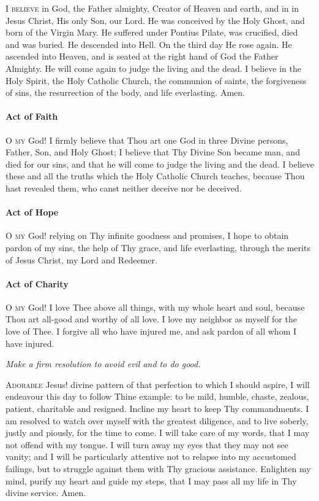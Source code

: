 \documentclass{article}
\begin{document}
\begin{multicols}{3}
\textsc{I believe} in God, the Father almighty, Creator of Heaven and earth,
and in in Jesus Christ, His only Son, our Lord. He was conceived by
the Holy Ghost, and born of the Virgin Mary. He suffered under Pontius
Pilate, was crucified, died and was buried. He descended into Hell.
On the third day He rose again. He ascended into Heaven, and is seated
at the right hand of God the Father Almighty. He will come again to
judge the living and the dead. I believe in the Holy Spirit, the Holy
Catholic Church, the communion of saints, the forgiveness of sins, the
resurrection of the body, and life everlasting. Amen. 

\paragraph{Act of Faith}

\textsc{O my} God! I firmly believe that Thou art one God in three Divine persons,
Father, Son, and Holy Ghost; I believe that Thy Divine Son became man,
and died for our sins, and that he will come to judge the living and the
dead. I believe these and all the truths which the Holy Catholic Church
teaches, because Thou hast revealed them, who canst neither deceive nor
be deceived.

\paragraph{Act of Hope}

\textsc{O my} God! relying on Thy infinite goodness and promises, I hope to obtain
pardon of my sins, the help of Thy grace, and life everlasting, through
the merits of Jesus Christ, my Lord and Redeemer. 

\paragraph{Act of Charity}

\textsc{O my} God! I love Thee above all things, with my whole heart and soul,
because Thou art all-good and worthy of all love. I love my neighbor as
myself for the love of Thee. I forgive all who have injured me, and ask
pardon of all whom I have injured. 

\textit{Make a firm resolution to avoid evil and to do good.}

\textsc{Adorable} Jesus! divine pattern of that perfection to which I should aspire,
I will endeavour this day to follow Thine example: to be mild, humble, chaste,
zealous, patient, charitable and resigned. Incline my heart to keep Thy
commandments. I am resolved to watch over myself with the greatest diligence,
and to live soberly, justly and piously, for the time to come. I will take
care of my words, that I may not offend with my tongue. I will turn away my
eyes that they may not see vanity; and I will be particularly attentive not
to relapse into my accustomed failings, but to struggle against them with Thy
gracious assistance. Enlighten my mind, purify my heart and guide my steps,
that I may pass all my life in Thy divine service. Amen.


\end{multicols}
\end{document}
